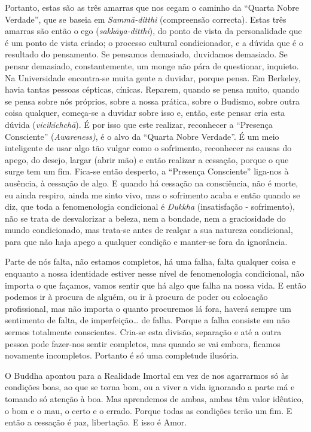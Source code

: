 Portanto, estas são as três amarras que nos cegam o caminho da ``Quarta
Nobre Verdade'', que se baseia em \emph{Sammā-ditthi} (compreensão
correcta). Estas três amarras são então o ego (\emph{sakkāya-ditthi}),
do ponto de vista da personalidade que é um ponto de vista criado; o
processo cultural condicionador, e a dúvida que é o resultado do
pensamento. Se pensamos demasiado, duvidamos demasiado. Se pensar
demasiado, constantemente, um monge não pára de questionar, inquieto. Na
Universidade encontra-se muita gente a duvidar, porque pensa. Em
Berkeley, havia tantas pessoas cépticas, cínicas. Reparem, quando se
pensa muito, quando se pensa sobre nós próprios, sobre a nossa prática,
sobre o Budismo, sobre outra coisa qualquer, começa-se a duvidar sobre
isso e, então, este pensar cria esta dúvida (\emph{vicikichchā}). É por
isso que este realizar, reconhecer a ``Presença Consciente''
(\emph{Awareness)}, é o alvo da ``Quarta Nobre Verdade''. É um meio
inteligente de usar algo tão vulgar como o sofrimento, reconhecer as
causas do apego, do desejo, largar (abrir mão) e então realizar a
cessação, porque o que surge tem um fim. Fica-se então desperto, a
``Presença Consciente'' liga-nos à ausência, à cessação de algo. E
quando há cessação na consciência, não é morte, eu ainda respiro, ainda
me sinto vivo, mas o sofrimento acaba e então quando se diz, que toda a
fenomenologia condicional é \emph{Dukkha} (insatisfação - sofrimento),
não se trata de desvalorizar a beleza, nem a bondade, nem a graciosidade
do mundo condicionado, mas trata-se antes de realçar a sua natureza
condicional, para que não haja apego a qualquer condição e manter-se
fora da ignorância.

Parte de nós falta, não estamos completos, há uma falha, falta qualquer
coisa e enquanto a nossa identidade estiver nesse nível de fenomenologia
condicional, não importa o que façamos, vamos sentir que há algo que
falha na nossa vida. E então podemos ir à procura de alguém, ou ir à
procura de poder ou colocação profissional, mas não importa o quanto
procuremos lá fora, haverá sempre um sentimento de falta, de
imperfeição\ldots{} de falha. Porque a falha consiste em não sermos
totalmente conscientes. Cria-se esta divisão, separação e até a outra
pessoa pode fazer-nos sentir completos, mas quando se vai embora,
ficamos novamente incompletos. Portanto é só uma completude ilusória.

O Buddha apontou para a Realidade Imortal em vez de nos agarrarmos só às
condições boas, ao que se torna bom, ou a viver a vida ignorando a parte
má e tomando só atenção à boa. Mas aprendemos de ambas, ambas têm valor
idêntico, o bom e o mau, o certo e o errado. Porque todas as condições
terão um fim. E então a cessação é paz, libertação. E isso é Amor.

